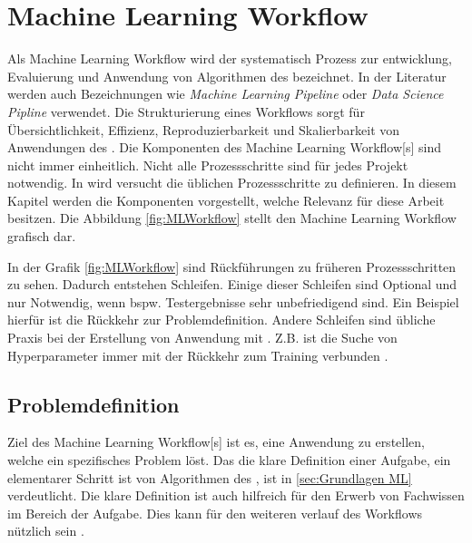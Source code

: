 \section{Machine Learning Workflow} \label{sec:MLWF}
Als \gls{Machine Learning Workflow} wird der systematisch Prozess zur entwicklung, Evaluierung und Anwendung von Algorithmen des  bezeichnet. In der Literatur werden auch Bezeichnungen wie \textit{Machine Learning Pipeline} oder \textit{Data Science Pipline} verwendet. Die Strukturierung eines Workflows sorgt für Übersichtlichkeit, Effizienz, Reproduzierbarkeit und Skalierbarkeit von Anwendungen des . Die Komponenten des \gls{Machine Learning Workflow}[s] sind nicht immer einheitlich. Nicht alle Prozessschritte sind für jedes Projekt notwendig. In \cite{Biswas.2022} wird versucht die üblichen Prozessschritte zu definieren. In diesem Kapitel werden die Komponenten vorgestellt, welche Relevanz für diese Arbeit besitzen. Die Abbildung \ref{fig:MLWorkflow} stellt den \gls{Machine Learning Workflow} grafisch dar.


In der Grafik \ref{fig:MLWorkflow} sind Rückführungen zu früheren Prozessschritten zu sehen. Dadurch entstehen Schleifen. Einige dieser Schleifen sind Optional und nur Notwendig, wenn bspw. Testergebnisse sehr unbefriedigend sind. Ein Beispiel hierfür ist die Rückkehr zur Problemdefinition. Andere Schleifen sind übliche Praxis bei der Erstellung von Anwendung mit . Z.B. ist die Suche von \gls{Hyperparameter} immer mit der Rückkehr zum Training verbunden \cite{Biswas.2022, Zheng.2018, Zheng.2015, Elshawi.2019}. 

\subsection{Problemdefinition}
Ziel des \gls{Machine Learning Workflow}[s] ist es, eine Anwendung zu erstellen, welche ein spezifisches Problem löst. Das die klare Definition einer Aufgabe, ein elementarer Schritt ist von Algorithmen des , ist in \ref{sec:Grundlagen ML} verdeutlicht. Die klare Definition ist auch hilfreich für den Erwerb von Fachwissen im Bereich der Aufgabe. Dies kann für den weiteren verlauf des Workflows nützlich sein \cite{Biswas.2022, Zheng.2018, Nielsen.2020}.

